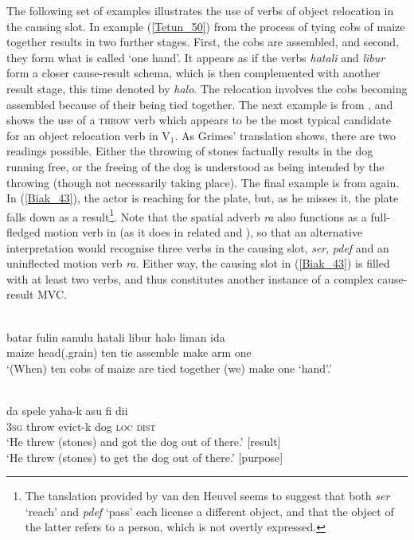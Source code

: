 The following set of examples illustrates the use of verbs of object relocation in the causing slot. In example (\ref{Tetun_50}) from  the process of tying cobs of maize together results in two further stages. First, the cobs are assembled, and second, they form what is called `one hand'. It appears as if the verbs \textit{hatali} and \textit{libur} form a closer cause-result schema, which is then complemented with another result stage, this time denoted by \textit{halo}. The relocation involves the cobs becoming assembled because of their being tied together. The next example is from , and shows the use of a \textsc{throw} verb which appears to be the most typical candidate for an object relocation verb in V$_1$. As Grimes' translation shows, there are two readings possible. Either the throwing of stones factually results in the dog running free, or the freeing of the dog is understood as being intended by the throwing (though not necessarily taking place). The final example is from  again. In (\ref{Biak_43}), the actor is reaching for the plate, but, as he misses it, the plate falls down as a result\footnote{The tanslation provided by van den Heuvel seems to suggest that both \textit{ser} `reach' and \textit{pdef} `pass' each license a different object, and that the object of the latter refers to a person, which is not overtly expressed.}. Note that the spatial adverb \textit{ra} also functions as a full-fledged motion verb in  (as it does in related  and ), so that an alternative interpretation would recognise three verbs in the causing slot, \textit{ser}, \textit{pdef} and an uninflected motion verb \textit{ra}. Either way, the causing slot in (\ref{Biak_43}) is filled with at least two verbs, and thus constitutes another instance of a complex cause-result MVC.

\ea \label{Tetun_50}
\\
\gll batar fulin sanulu hatali libur halo liman ida \\
maize head(.grain) ten tie assemble make arm one \\
\glft `(When) ten cobs of maize are tied together (we) make one `hand'.'\\ 
\z

\ea \label{Buru_21}
\\
\gll da spele yaha-k asu fi dii \\
3\textsc{sg} throw evict-k dog \textsc{loc} \textsc{dist} \\
\glft `He threw (stones) and got the dog out of there.' [result] \\
`He threw (stones) to get the dog out of there.' [purpose]\\ 
\z

